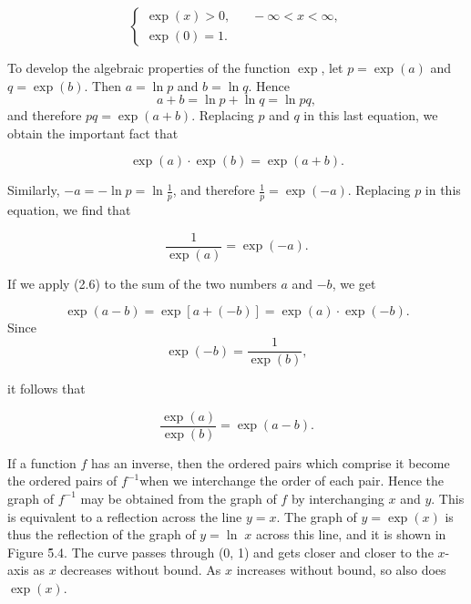 \begin{theorem} %
$$
\left \{
\begin{array}{ll}
\exp(x) > 0, &\;\;\; -\infty < x < \infty, \\
\exp(0) = 1. &
\end{array}
 \right.
$$
\end{theorem}

To develop the algebraic properties of the function $\exp$, let $p = \exp (a)$ and $q = \exp (b)$.  Then $a = \ln p$ and $b = \ln q$. Hence
$$
a + b = \ln p + \ln q = \ln pq,
$$
\noindent and therefore $pq = \exp(a + b)$. Replacing $p$ and $q$ in this last equation, we obtain the important fact that 

\begin{theorem} %
$$
\exp(a) \cdot \exp(b) = \exp(a + b).
$$
\end{theorem}

Similarly, $-a = -\ln p = \ln {\frac{1}{p}}$, and therefore $\frac{1}{p} = \exp (-a)$. 
Replacing $p$ in this equation, we find that

\begin{theorem} %
$$
\frac{1}{\exp (a)} = \exp (-a).
$$
\end{theorem}

If we apply (2.6) to the sum of the two numbers $a$ and $-b$, we get 

$$
\exp (a - b) = \exp [a + (-b)] = \exp(a) \cdot \exp(-b).
$$ 
\noindent Since 
$$
\exp(-b) = \frac{1}{\exp(b)},
$$

\noindent it follows that

\begin{theorem} %
$$
\frac{\exp(a)}{\exp(b)} = \exp(a - b).
$$
\end{theorem}

If a function $f$ has an inverse, then the ordered pairs which comprise it become the ordered pairs of $f^{-1}$when we interchange the order of each pair. Hence the graph of $f^{-1}$ may be obtained from the graph of $f$ by interchanging $x$ and $y$. This is equivalent to a reflection across the line $y = x$. The graph of $y = \exp(x)$ is thus the reflection of the graph of $y = \ln\; x$ across this line, and it is shown in Figure \f{5.4}. The curve passes through (0, 1) and gets closer and closer to the $x$-axis as 
$x$ decreases without bound. As $x$ increases without bound, so also does $\exp(x)$.


